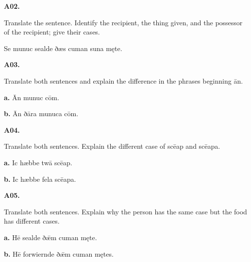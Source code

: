 \par\begin{minipage}{\linewidth}\raggedright
\textbf{A02.}

Translate the sentence. Identify the recipient, the thing given, and the possessor of the recipient; give their cases.

Se munuc sealde ðæs cuman suna męte.

\end{minipage}\par\addvspace{4pt}

\par\begin{minipage}{\linewidth}\raggedright
\textbf{A03.}

Translate both sentences and explain the difference in the phrases beginning ān.

\textbf{a.} Ān munuc cōm.

\textbf{b.} Ān ðāra munuca cōm.

\end{minipage}\par\addvspace{4pt}

\par\begin{minipage}{\linewidth}\raggedright
\textbf{A04.}

Translate both sentences. Explain the different case of scēap and scēapa.

\textbf{a.} Ic hæbbe twā scēap.

\textbf{b.} Ic hæbbe fela scēapa.

\end{minipage}\par\addvspace{4pt}

\par\begin{minipage}{\linewidth}\raggedright
\textbf{A05.}

Translate both sentences. Explain why the person has the same case but the food has different cases.

\textbf{a.} Hē sealde ðǣm cuman męte.

\textbf{b.} Hē forwiernde ðǣm cuman mętes.

\end{minipage}\par\addvspace{4pt}


